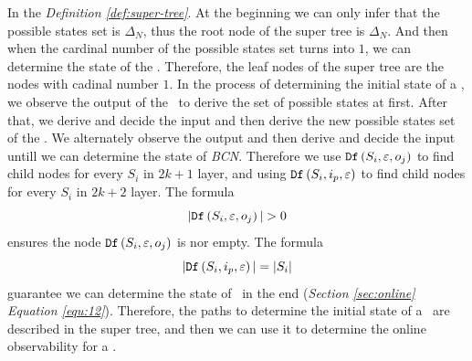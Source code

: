In the {\em Definition \ref{def:super-tree}}. At the beginning we can only infer that the possible states set is $\Delta_N$, thus the root node of the super tree is $\Delta_N$. And then when the cardinal number of the possible states set turns into $1$, we can determine the state of the \BCN. Therefore, the leaf nodes of the super tree are the nodes with cadinal number $1$. In the process of determining the initial state of a \BCN, we observe the output of the \BCN\ to derive the set of possible states at first. After that, we derive and decide the input and then derive the new possible states set of the \BCN. We alternately observe the output and then derive and decide the input untill we can determine the state of {\em BCN}. Therefore we use ${\tt Df}\left(S_i,\varepsilon, o_j\right)$ to find child nodes for every $S_i$ in $2k+1$ layer, and using ${\tt Df}\left(S_i,i_p,\varepsilon\right)$ to find child nodes for every $S_i$ in $2k+2$ layer. The formula 
\[|\Ded\left(S_i,\varepsilon, o_j\right)|>0\]
 ensures the node ${\tt Df}\left(S_i,\varepsilon, o_j\right)$ is nor empty. The formula 
 \[|{\tt Df}\left(S_i,i_p,\varepsilon\right)|=|S_i|\] 
 guarantee we can determine the state of \BCN\ in the end ({\em Section \ref{sec:online}} {\em Equation \ref{equ:12}}). Therefore, the paths to determine the initial state of a \BCN\ are described in the super tree, and then we can use it to determine the online observability for a \BCN.

